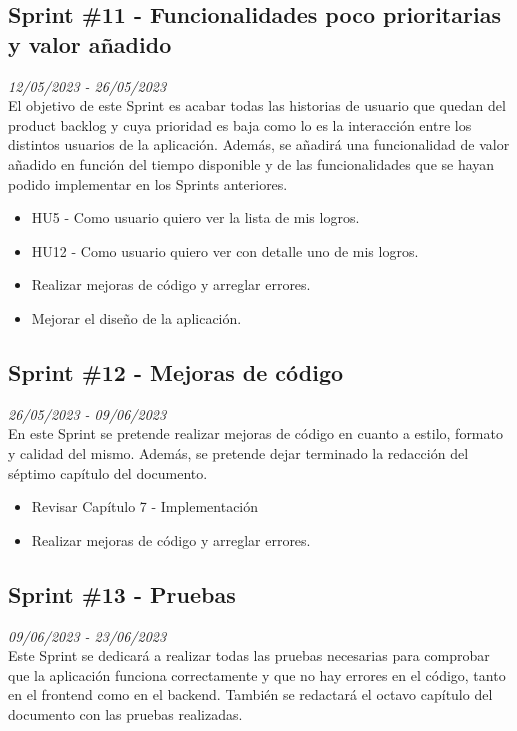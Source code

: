 \subsection{Sprint \#11 - Funcionalidades poco prioritarias y valor añadido}
\textit{12/05/2023   -   26/05/2023}\\

El objetivo de este Sprint es acabar todas las historias de usuario que quedan del product backlog y cuya prioridad es baja como lo es la interacción entre los distintos usuarios de la aplicación. Además, se añadirá una funcionalidad de valor añadido
en función del tiempo disponible y de las funcionalidades que se hayan podido implementar en los Sprints anteriores.
\begin{itemize}
    \item HU5 - Como usuario quiero ver la lista de mis logros.
    \item HU12 - Como usuario quiero ver con detalle uno de mis logros.
    \item Realizar mejoras de código y arreglar errores.
    \item Mejorar el diseño de la aplicación.
\end{itemize}

\subsection{Sprint \#12 - Mejoras de código}
\textit{26/05/2023   -   09/06/2023}\\

En este Sprint se pretende realizar mejoras de código en cuanto a estilo, formato y calidad del mismo. Además, se pretende dejar terminado la redacción
del séptimo capítulo del documento.
\begin{itemize}
    \item Revisar Capítulo 7 - Implementación
    \item Realizar mejoras de código y arreglar errores.
\end{itemize}

\subsection{Sprint \#13 - Pruebas }
\textit{09/06/2023   -   23/06/2023}\\

Este Sprint se dedicará a realizar todas las pruebas necesarias para comprobar que la aplicación funciona correctamente y que no hay errores en el código, tanto
en el frontend como en el backend. También se redactará el octavo capítulo del documento con las pruebas realizadas.

